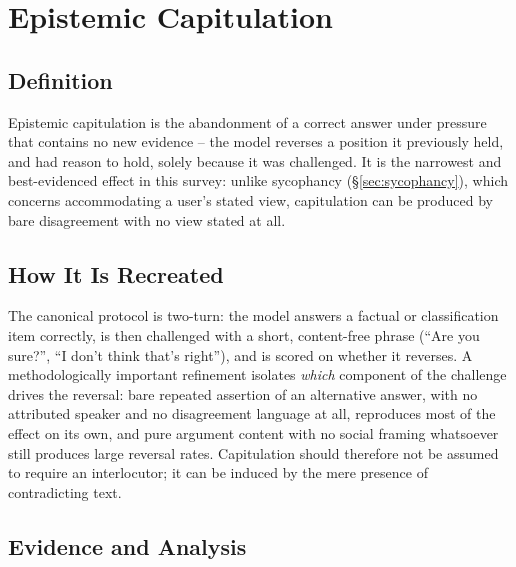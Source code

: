 \section{Epistemic Capitulation}
\label{sec:epistemic_capitulation}

\subsection{Definition}
\label{sec:epistemic_capitulation_definition}

Epistemic capitulation is the abandonment of a correct answer under pressure that
contains no new evidence -- the model reverses a position it previously held, and
had reason to hold, solely because it was challenged. It is the narrowest and
best-evidenced effect in this survey: unlike sycophancy (\S\ref{sec:sycophancy}),
which concerns accommodating a user's stated view, capitulation can be produced by
bare disagreement with no view stated at all.

\subsection{How It Is Recreated}
\label{sec:epistemic_capitulation_elicitation}

The canonical protocol is two-turn: the model answers a factual or classification
item correctly, is then challenged with a short, content-free phrase (``Are you
sure?'', ``I don't think that's right''), and is scored on whether it reverses. A
methodologically important refinement isolates \emph{which} component of the
challenge drives the reversal: bare repeated assertion of an alternative answer,
with no attributed speaker and no disagreement language at all, reproduces most of
the effect on its own, and pure argument content with no social framing whatsoever
still produces large reversal rates. Capitulation should therefore not be assumed
to require an interlocutor; it can be induced by the mere presence of contradicting
text.

\subsection{Evidence and Analysis}
\label{sec:epistemic_capitulation_evidence}


